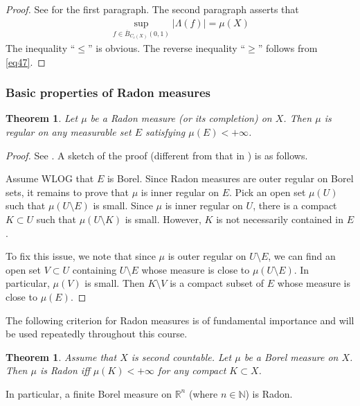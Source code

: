\documentclass[12pt,b5paper,notitlepage]{article}
\theoremstyle{definition}
\theoremstyle{plain}
\newtheorem{thm}[df]{Theorem}
\newcommand{\ovl}{\overline}
\newcommand{\Nbb}{\mathbb N}
\newcommand{\Rbb}{\mathbb R}
\numberwithin{equation}{section}
\begin{document}
\begin{proof}
See \cite[Sec. 25.3]{Gui-A} for the first paragraph. The second paragraph asserts that
\begin{align*}
\sup_{f\in\ovl B_{C_c(X)}(0,1)}|\Lambda(f)|= \mu(X)
\end{align*}
The inequality ``$\leq$'' is obvious. The reverse inequality ``$\geq$'' follows from \eqref{eq47}.
\end{proof}



\subsubsection{Basic properties of Radon measures}

\begin{thm}\label{lb101}
Let $\mu$ be a Radon measure (or its completion) on $X$. Then $\mu$ is regular on any measurable set $E$ satisfying $\mu(E)<+\infty$.
\end{thm}

\begin{proof}
See \cite[Sec. 25.4]{Gui-A}. A sketch of the proof (different from that in \cite{Gui-A}) is as follows. 

Assume WLOG that $E$ is Borel. Since Radon measures are outer regular on Borel sets, it remains to prove that $\mu$ is inner regular on $E$. Pick an open set $\mu(U)$ such that $\mu(U\setminus E)$ is small. Since $\mu$ is inner regular on $U$, there is a compact $K\subset U$ such that $\mu(U\setminus K)$ is small. However, $K$ is not necessarily contained in $E$. 

To fix this issue, we note that since $\mu$ is outer regular on $U\setminus E$, we can find an open set $V\subset U$ containing $U\setminus E$ whose measure is close to $\mu(U\setminus E)$. In particular, $\mu(V)$ is small. Then $K\setminus V$ is a compact subset of $E$ whose measure is close to $\mu(E)$.
\end{proof}


The following criterion for Radon measures is of fundamental importance and will be used repeatedly throughout this course.

\begin{thm}\label{lb64}
Assume that $X$ is second countable. Let $\mu$ be a Borel measure on $X$. Then $\mu$ is Radon iff $\mu(K)<+\infty$ for any compact $K\subset X$.
\end{thm}

In particular, a finite Borel measure on $\Rbb^n$ (where $n\in\Nbb$) is Radon.
\end{document}
